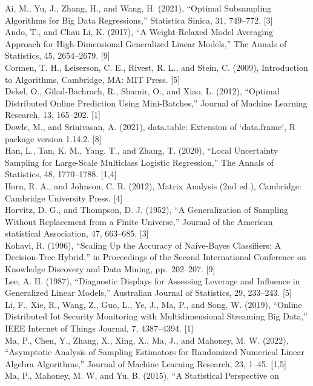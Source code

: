 \documentclass[
  10
]{article}
\begin{document}
Ai, M., Yu, J., Zhang, H., and Wang, H. (2021), ``Optimal Subsampling
Algorithms for Big Data Regressions,'' Statistica Sinica, 31, 749--772.
{[}3{]}\\
Ando, T., and Chau Li, K. (2017), ``A Weight-Relaxed Model Averaging
Approach for High-Dimensional Generalized Linear Models,'' The Annals of
Statistics, 45, 2654--2679. {[}9{]}\\
Cormen, T. H., Leiserson, C. E., Rivest, R. L., and Stein, C. (2009),
Introduction to Algorithms, Cambridge, MA: MIT Press. {[}5{]}\\
Dekel, O., Gilad-Bachrach, R., Shamir, O., and Xiao, L. (2012),
``Optimal Distributed Online Prediction Using Mini-Batches,'' Journal of
Machine Learning Research, 13, 165--202. {[}1{]}\\
Dowle, M., and Srinivasan, A. (2021), data.table: Extension of
`data.frame`, R package version 1.14.2. {[}8{]}\\
Han, L., Tan, K. M., Yang, T., and Zhang, T. (2020), ``Local Uncertainty
Sampling for Large-Scale Multiclass Logistic Regression,'' The Annals of
Statistics, 48, 1770--1788. {[}1,4{]}\\
Horn, R. A., and Johnson, C. R. (2012), Matrix Analysis (2nd ed.),
Cambridge: Cambridge University Press. {[}4{]}\\
Horvitz, D. G., and Thompson, D. J. (1952), ``A Generalization of
Sampling Without Replacement from a Finite Universe,'' Journal of the
American statistical Association, 47, 663--685. {[}3{]}\\
Kohavi, R. (1996), ``Scaling Up the Accuracy of Naive-Bayes Classifiers:
A Decision-Tree Hybrid,'' in Proceedings of the Second International
Conference on Knowledge Discovery and Data Mining, pp.~202--207.
{[}9{]}\\
Lee, A. H. (1987), ``Diagnostic Displays for Assessing Leverage and
Influence in Generalized Linear Models,'' Australian Journal of
Statistics, 29, 233--243. {[}5{]}\\
Li, F., Xie, R., Wang, Z., Guo, L., Ye, J., Ma, P., and Song, W. (2019),
``Online Distributed Iot Security Monitoring with Multidimensional
Streaming Big Data,'' IEEE Internet of Things Journal, 7, 4387--4394.
{[}1{]}\\
Ma, P., Chen, Y., Zhang, X., Xing, X., Ma, J., and Mahoney, M. W.
(2022), ``Asymptotic Analysis of Sampling Estimators for Randomized
Numerical Linear Algebra Algorithms,'' Journal of Machine Learning
Research, 23, 1--45. {[}1,5{]}\\
Ma, P., Mahoney, M. W, and Yu, B. (2015), ``A Statistical Perspective on
\end{document}
